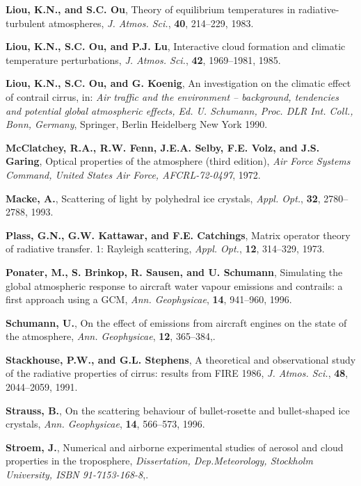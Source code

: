 \documentclass[agp]{svjour}
\begin{document}
\begin{thebibliography}{}
 {\bf Liou, K.N., and S.C. Ou}, Theory
of equilibrium temperatures in radiative-turbulent atmospheres, {\it J.
Atmos. Sci.}, {\bf 40}, 214--229, 1983.

 {\bf Liou, K.N., S.C. Ou, and P.J. Lu},
Interactive cloud formation and climatic temperature perturbations, {\it
J. Atmos. Sci.}, {\bf 42}, 1969--1981, 1985.

 {\bf Liou, K.N., S.C. Ou, and G.
Koenig}, An investigation on the climatic effect of contrail cirrus, in:
{\it Air traffic and the environment -- background, tendencies and
potential global atmospheric effects, Ed. U. Schumann, Proc. DLR Int.
Coll., Bonn, Germany}, Springer, Berlin Heidelberg New York 1990.

 {\bf McClatchey, R.A., R.W. Fenn,
J.E.A. Selby, F.E. Volz, and J.S. Garing}, Optical properties of the
atmosphere (third edition), {\it Air Force Systems Command, United
States Air Force, AFCRL-72-0497}, 1972.

 {\bf Macke, A.}, Scattering of light by
polyhedral ice crystals, {\it Appl. Opt.}, {\bf 32}, 2780--2788, 1993.

 {\bf Plass, G.N., G.W. Kattawar, and
F.E. Catchings}, Matrix operator theory of radiative transfer. 1:
Rayleigh scattering, {\it Appl. Opt.}, {\bf 12}, 314--329, 1973.

 {\bf Ponater, M., S. Brinkop, R.
Sausen, and U. Schumann}, Simulating the global atmospheric response to
aircraft water vapour emissions and contrails: a first approach using a
GCM, {\it Ann. Geophysicae}, {\bf 14}, 941--960, 1996.

 {\bf Schumann, U.}, On the effect of
emissions from aircraft engines on the state of the atmosphere, {\it
Ann. Geophysicae}, {\bf 12}, 365--384,.

 {\bf Stackhouse, P.W., and
G.L. Stephens}, A theoretical and observational study of the radiative
properties of cirrus: results from FIRE 1986, {\it J. Atmos. Sci.}, {\bf
48}, 2044--2059, 1991.

 {\bf Strauss, B.}, On the scattering
behaviour of bullet-rosette and bullet-shaped ice crystals, {\it Ann.
Geophysicae}, {\bf 14}, 566--573, 1996.

 {\bf Stroem, J.}, Numerical and airborne
experimental studies of aerosol and cloud properties in the troposphere,
{\it Dissertation, Dep.\break Meteorology, Stockholm University, ISBN
91-7153-168-8},.


\end{thebibliography}
\end{document}
